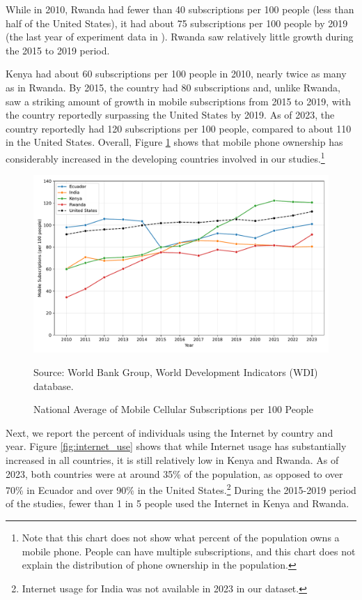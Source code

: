 \documentclass[12pt]{article}
\begin{document}
While in 2010, Rwanda had fewer than 40 subscriptions per 100 people (less than half of the United States), it had about 75 subscriptions per 100 people by 2019 (the last year of experiment data in \textcite{fabregas_digital_2025}). Rwanda saw relatively little growth during the 2015 to 2019 period.

Kenya had about 60 subscriptions per 100 people in 2010, nearly twice as many as in Rwanda. By 2015, the country had 80 subscriptions and, unlike Rwanda, saw a striking amount of growth in mobile subscriptions from 2015 to 2019, with the country reportedly surpassing the United States by 2019. As of 2023, the country reportedly had 120 subscriptions per 100 people, compared to about 110 in the United States. Overall, Figure \ref{fig:mobile_subscriptions} shows that mobile phone ownership has considerably increased in the developing countries involved in our studies.\footnote{Note that this chart does not show what percent of the population owns a mobile phone. People can have multiple subscriptions, and this chart does not explain the distribution of phone ownership in the population.}
\begin{figure}[H]
    \centering
    \caption{National Average of Mobile Cellular Subscriptions per 100 People}
    \includegraphics[width=\textwidth]{../output/mobile_subscriptions.pdf}
    \begin{minipage}{0.9\textwidth}
    \footnotesize
    Source: World Bank Group, World Development Indicators (WDI) database. 
    \end{minipage}
    \label{fig:mobile_subscriptions}
\end{figure}

Next, we report the percent of individuals using the Internet by country and year. Figure \ref{fig:internet_use} shows that while Internet usage has substantially increased in all countries, it is still relatively low in Kenya and Rwanda. As of 2023, both countries were at around 35\% of the population, as opposed to over 70\% in Ecuador and over 90\% in the United States.\footnote{Internet usage for India was not available in 2023 in our dataset.} During the 2015-2019 period of the \textcite{fabregas_digital_2025} studies, fewer than 1 in 5 people used the Internet in Kenya and Rwanda.
\end{document}
